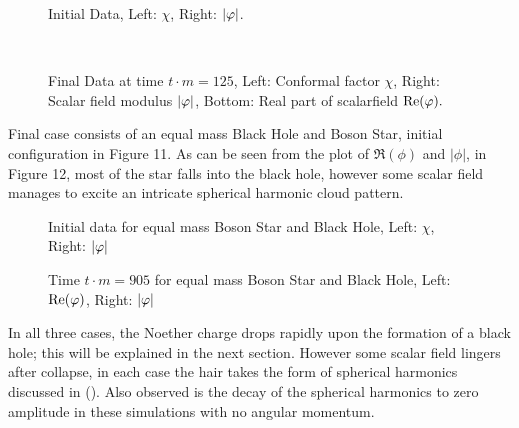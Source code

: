   \begin{figure}[H]
  \caption{Initial Data, Left: $\chi$, Right: $|\varphi|$.}
  \centering
  \hfill
\end{figure}
  \begin{figure}[H]
  \caption{Final Data at time $t\cdot m = 125$, Left: Conformal factor $\chi$, Right: Scalar field modulus $|\varphi|$, Bottom: Real part of scalarfield $\mathrm{Re}(\varphi).$}
  \centering
  \hfill
  \\
\end{figure}
Final case consists of an equal mass Black Hole and Boson Star, initial configuration in Figure 11. As can be seen from the plot of $\Re(\phi)$ and $|\phi|$, in Figure 12, most of the star falls into the black hole, however some scalar field manages to excite an intricate spherical harmonic cloud pattern.
  \begin{figure}[H]
  \caption{Initial data for equal mass Boson Star and Black Hole, Left: $\chi$, Right: $|\varphi|$}
  \centering
  \hfill
\end{figure}
  \begin{figure}[H]
  \caption{Time $t\cdot m=905$ for equal mass Boson Star and Black Hole, Left: $\Re(\varphi)$, Right: $|\varphi|$}
  \centering
  \hfill
\end{figure}

In all three cases, the Noether charge drops rapidly upon the formation of a black hole; this will be explained in the next section. However some scalar field lingers after collapse, in each case the hair takes the form of spherical harmonics discussed in (). Also observed is the decay of the spherical harmonics to zero amplitude in these simulations with no angular momentum. 
 
